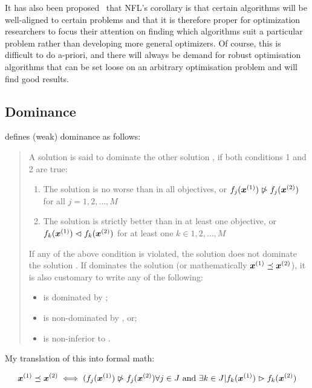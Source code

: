 It has also been proposed \citehere\ that NFL's corollary is that
certain algorithms will be well-aligned to certain problems and that
it is therefore proper for optimization researchers to focus their
attention on finding which algorithms suit a particular problem rather
than developing more general optimizers.  Of course, this is difficult
to do a-priori, and there will always be demand for robust
optimisation algorithms that can be set loose on an arbitrary
optimisation problem and will find good results.

\subsection{Dominance}
\citet[28]{deb.kalyanmoy2001multi-objective} defines (weak) dominance as follows:

\begin{quote}
  A solution  is said to dominate the other solution ,
  if both conditions 1 and 2 are true:
  \begin{enumerate}
  \item The solution  is no worse than  in all
    objectives, or $f_j(\boldsymbol{x}^{(1)}) \ntriangleright f_j(\boldsymbol{x}^{(2)})$ for
    all $j = 1,2,\ldots,M$
  \item The solution  is strictly better than  in at
    least one objective, or $f_k(\boldsymbol{x}^{(1)}) \vartriangleleft
    f_k(\boldsymbol{x}^{(2)})$ for at least one $k \in {1, 2,\ldots,M}$
  \end{enumerate}
  
  If any of the above condition is violated, the solution  does not dominate the solution .  
  If  dominates the solution  (or mathematically $\boldsymbol{x}^{(1)} \preceq \boldsymbol{x}^{(2)}$), it is also customary to write any of the following:
  \begin{itemize}
  \item {} is dominated by ;
  \item {} is non-dominated by , or;
  \item {} is non-inferior to .
  \end{itemize}
\end{quote}

My translation of this into formal math:

\begin{equation}
  \label{eq:3}
  \boldsymbol{x}^{(1)} \preceq \boldsymbol{x}^{(2)} \iff ( f_j(\boldsymbol{x}^{(1)}) \ntriangleright f_j(\boldsymbol{x}^{(2)}) \forall j \in J \textrm{~and~} \exists k \in J | f_k(\boldsymbol{x}^{(1)}) \vartriangleright f_k(\boldsymbol{x}^{(2)})
\end{equation}

